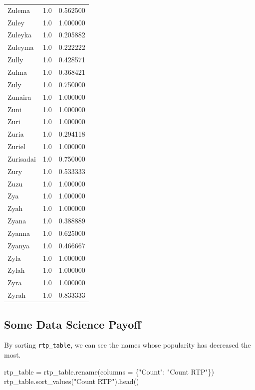 \documentclass[
  letterpaper,
  DIV=11,
  numbers=noendperiod]{scrreprt}
\newenvironment{Shaded}{\begin{snugshade}}{\end{snugshade}}
\newcommand{\NormalTok}[1]{\textcolor[rgb]{0.00,0.23,0.31}{#1}}
\newcommand{\OperatorTok}[1]{\textcolor[rgb]{0.37,0.37,0.37}{#1}}
\newcommand{\StringTok}[1]{\textcolor[rgb]{0.13,0.47,0.30}{#1}}
\begin{document}
\begin{tabular}{lrr}
Zulema          &   1.0 &   0.562500 \\
Zuley           &   1.0 &   1.000000 \\
Zuleyka         &   1.0 &   0.205882 \\
Zuleyma         &   1.0 &   0.222222 \\
Zully           &   1.0 &   0.428571 \\
Zulma           &   1.0 &   0.368421 \\
Zuly            &   1.0 &   0.750000 \\
Zunaira         &   1.0 &   1.000000 \\
Zuni            &   1.0 &   1.000000 \\
Zuri            &   1.0 &   1.000000 \\
Zuria           &   1.0 &   0.294118 \\
Zuriel          &   1.0 &   1.000000 \\
Zurisadai       &   1.0 &   0.750000 \\
Zury            &   1.0 &   0.533333 \\
Zuzu            &   1.0 &   1.000000 \\
Zya             &   1.0 &   1.000000 \\
Zyah            &   1.0 &   1.000000 \\
Zyana           &   1.0 &   0.388889 \\
Zyanna          &   1.0 &   0.625000 \\
Zyanya          &   1.0 &   0.466667 \\
Zyla            &   1.0 &   1.000000 \\
Zylah           &   1.0 &   1.000000 \\
Zyra            &   1.0 &   1.000000 \\
Zyrah           &   1.0 &   0.833333 \\
\bottomrule
\end{tabular}

\hypertarget{some-data-science-payoff}{%
\subsection{Some Data Science Payoff}\label{some-data-science-payoff}}

By sorting \texttt{rtp\_table}, we can see the names whose popularity
has decreased the most.

\begin{Shaded}
\begin{Highlighting}[]
\NormalTok{rtp\_table }\OperatorTok{=}\NormalTok{ rtp\_table.rename(columns }\OperatorTok{=}\NormalTok{ \{}\StringTok{"Count"}\NormalTok{: }\StringTok{"Count RTP"}\NormalTok{\})}
\NormalTok{rtp\_table.sort\_values(}\StringTok{"Count RTP"}\NormalTok{).head()}
\end{Highlighting}
\end{Shaded}
\end{document}
